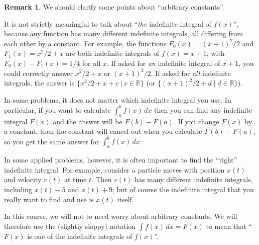 \documentclass[a4paper]{book}
\newcommand{\RED}[1]{{\color{red}#1}}
\newcommand{\R}         {{\mathbb{R}}}
\newcommand{\st}        {\;|\;}
\renewcommand{\:}{\colon}
\newcommand{\EMPH}[1]{\RED{\emph{#1}}}
\theoremstyle{definition}
\newtheorem{remark}[theorem]{Remark}
\begin{document}
\begin{remark}
 We should clarify some points about ``arbitrary constants''.

 It is not strictly meaningful to talk about ``\EMPH{the} indefinite
 integral of $f(x)$'', because any function has many different
 indefinite integrals, all differing from each other by a constant.
 For example, the functions $F_0(x)=(x+1)^2/2$ and $F_1(x)=x^2/2+x$
 are both indefinite integrals of $f(x)=x+1$, with
 $F_0(x)-F_1(x)=1/4$ for all $x$.  If asked for \EMPH{an} indefinite
 integral of $x+1$, you could correctly answer $x^2/2+x$ or
 $(x+1)^2/2$.  If asked for \EMPH{all} indefinite integrals, the
 answer is $\{x^2/2+x+c\st c\in\R\}$ (or
 $\{(x+1)^2/2+d\st d\in\R\}$).
 
 In some problems, it does not matter which indefinite integral you
 use.  In particular, if you want to calculate $\int_a^bf(x)\,dx$ then
 you can find any indefinite integral $F(x)$ and the answer will be
 $F(b)-F(a)$.  If you change $F(x)$ by a constant, then the constant
 will cancel out when you calculate $F(b)-F(a)$, so you get the same
 answer for $\int_a^bf(x)\,dx$.

 In some applied problems, however, it is often important to find the
 ``right'' indefinite integral.  For example, consider a particle
 moves with position $x(t)$ and velocity $v(t)$ at time $t$.  Then
 $v(t)$ has many different indefinite integrals, including $x(t)-5$
 and $x(t)+9$; but of course the indefinite integral that you really
 want to find and use is $x(t)$ itself.
 
 In this course, we will not to need worry about arbitrary constants.
 We will therefore use the (slightly sloppy) notation
  $\int f(x)\,dx=F(x)$ to mean that ``$F(x)$ is one of the indefinite
 integrals of $f(x)$''.
\end{remark}
\end{document}
